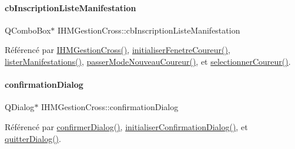 \mbox{\label{class_i_h_m_gestion_cross_a317ffd7cc1c9aa5d6e55c53568e44f98}} 
\paragraph{\texorpdfstring{cb\+Inscription\+Liste\+Manifestation}{cbInscriptionListeManifestation}}
{\footnotesize\ttfamily Q\+Combo\+Box$\ast$ I\+H\+M\+Gestion\+Cross\+::cb\+Inscription\+Liste\+Manifestation\hspace{0.3cm}{\ttfamily [private]}}



Référencé par \hyperlink{class_i_h_m_gestion_cross_a2c62fd83326a87456a403f46acc408c8}{I\+H\+M\+Gestion\+Cross()}, \hyperlink{class_i_h_m_gestion_cross_aa5d9de499a66e52b843c4ef4c6074a60}{initialiser\+Fenetre\+Coureur()}, \hyperlink{class_i_h_m_gestion_cross_a0eadd8592c966c89bf7b5a25a0ae7589}{lister\+Manifestations()}, \hyperlink{class_i_h_m_gestion_cross_ac8f336c95a5f0c9eb8a4bc1c4bb83445}{passer\+Mode\+Nouveau\+Coureur()}, et \hyperlink{class_i_h_m_gestion_cross_ad71963d500fd61995fdae94e833db163}{selectionner\+Coureur()}.

\mbox{\label{class_i_h_m_gestion_cross_a417b63ff11c3be6623d17718d9058768}} 
\paragraph{\texorpdfstring{confirmation\+Dialog}{confirmationDialog}}
{\footnotesize\ttfamily Q\+Dialog$\ast$ I\+H\+M\+Gestion\+Cross\+::confirmation\+Dialog\hspace{0.3cm}{\ttfamily [private]}}



Référencé par \hyperlink{class_i_h_m_gestion_cross_a144933ab31ae263be7267b93bfd53a82}{confirmer\+Dialog()}, \hyperlink{class_i_h_m_gestion_cross_aa1c728319c825df582a014fc5bd43ea4}{initialiser\+Confirmation\+Dialog()}, et \hyperlink{class_i_h_m_gestion_cross_a58b19fa84a16060a3dd951abeba2c543}{quitter\+Dialog()}.


